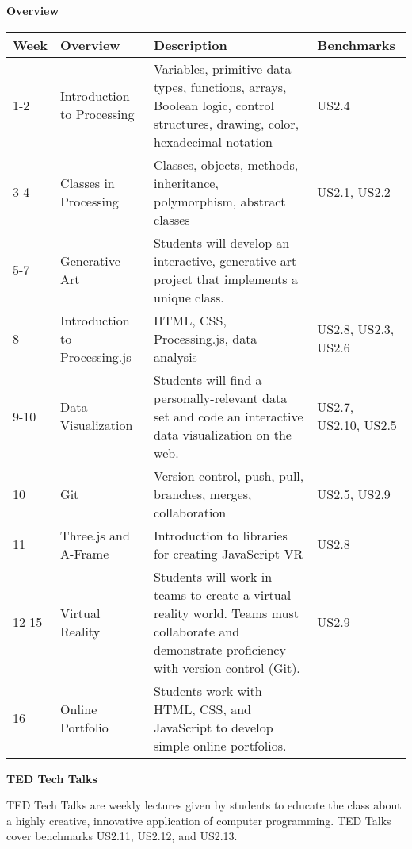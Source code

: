 \textbf{Overview}
\begin{longtable}{|p{1.8cm} | p{4cm} | p{6cm}|p{2cm}|}
	\hline
\textbf{Week} & \textbf{Overview}             & \textbf{Description}    & \textbf{Benchmarks}  \\ \hline
1-2           & Introduction to Processing    & Variables, primitive data types, functions, arrays, Boolean logic, control structures, drawing, color, hexadecimal notation                   & US2.4                \\ \hline
3-4           & Classes in Processing         & Classes, objects, methods, inheritance, polymorphism, abstract classes                                                                        & US2.1, US2.2         \\ \hline
5-7           & Generative Art                & Students will develop an interactive, generative art project that implements a unique class.                                                  &                     \\ \hline
8             & Introduction to Processing.js & HTML, CSS, Processing.js, data analysis                                                                                                       & US2.8, US2.3, US2.6  \\ \hline
9-10          & Data Visualization            & Students will find a personally-relevant data set and code an interactive data visualization on the web.                                      & US2.7, US2.10, US2.5 \\ \hline
10            & Git                           & Version control, push, pull, branches, merges, collaboration                                                                                  & US2.5, US2.9         \\ \hline
11            & Three.js and A-Frame          & Introduction to libraries for creating JavaScript VR                                                                                          & US2.8                \\ \hline
12-15         & Virtual Reality               & Students will work in teams to create a virtual reality world. Teams must collaborate and demonstrate proficiency with version control (Git). & US2.9                \\ \hline
16            & Online Portfolio              & Students work with HTML, CSS, and JavaScript to develop simple online portfolios.                                                             &                     \\ \hline

\end{longtable}
\newpage
\textbf{TED Tech Talks}\par
TED Tech Talks are weekly lectures given by students to educate the class about a highly creative, innovative application of computer programming. TED Talks cover benchmarks US2.11, US2.12, and US2.13.